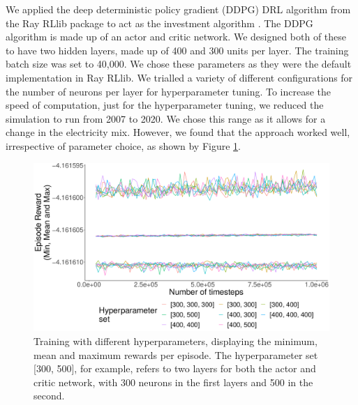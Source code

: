 \documentclass{article}
\begin{document}
We applied the deep deterministic policy gradient (DDPG) DRL algorithm \cite{Hunt2016a} from the Ray RLlib package to act as the investment algorithm \cite{Liang2014}. The DDPG algorithm is made up of an actor and critic network. We designed both of these to have two hidden layers, made up of 400 and 300 units per layer. The training batch size was set to 40,000. We chose these parameters as they were the default implementation in Ray RLlib. We trialled a variety of different configurations for the number of neurons per layer for hyperparameter tuning. To increase the speed of computation, just for the hyperparameter tuning, we reduced the simulation to run from 2007 to 2020. We chose this range as it allows for a change in the electricity mix. However, we found that the approach worked well, irrespective of parameter choice, as shown by Figure \ref{fig:hyperparameter_training}. %





\begin{figure}
\centering
\includegraphics[width=0.5\columnwidth]{figures/hyperparameter_plot_params.pdf}
\caption{Training with different hyperparameters, displaying the minimum, mean and maximum rewards per episode. The hyperparameter set [300, 500], for example, refers to two layers for both the actor and critic network, with 300 neurons in the first layers and 500 in the second.}
\label{fig:hyperparameter_training}
\end{figure}





\end{document}
